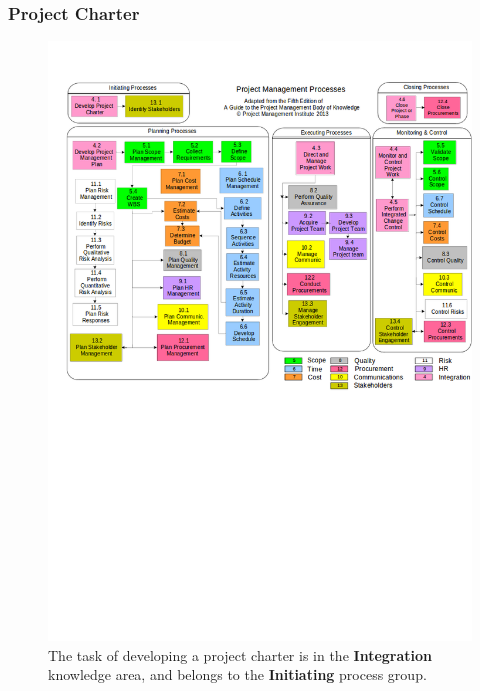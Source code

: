 \documentclass[aspectratio=169]{beamer}
\begin{document}
\begin{frame}
\frametitle{Project Charter}
\vspace{-0.5cm}
\begin{figure}
\caption{The task of developing a project charter is in the \textbf{Integration} knowledge area, and belongs to the \textbf{Initiating} process group.}
\vspace{-0.8cm}
\includegraphics[scale=0.3]{mapping}
\end{figure}
\end{frame}
\end{document}
